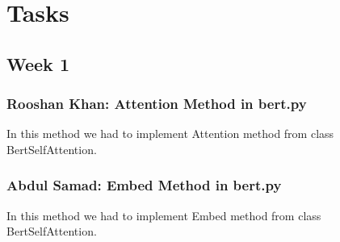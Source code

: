 \documentclass{article}
\begin{document}
\section{Tasks}
\subsection{Week 1}
\subsubsection{Rooshan Khan: Attention Method in bert.py}
In this method we had to implement Attention method from class BertSelfAttention.
\subsubsection{Abdul Samad: Embed Method in bert.py}
In this method we had to implement Embed method from class BertSelfAttention.
\end{document}

